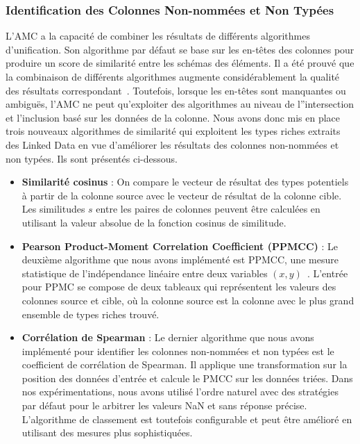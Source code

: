 \subsubsection{Identification des Colonnes Non-nomm\'{e}es et Non Typ\'{e}es}
L'AMC a la capacit\'{e} de combiner les r\'{e}sultats de diff\'{e}rents algorithmes d'unification. Son algorithme par d\'{e}faut se base sur les en-t\^{e}tes des colonnes pour produire un score de similarit\'{e} entre les sch\'{e}mas des \'{e}l\'{e}ments. Il a \'{e}t\'{e} prouv\'{e} que la combinaison de diff\'{e}rents algorithmes augmente consid\'{e}rablement la qualit\'{e} des r\'{e}sultats correspondant~\cite{Peukert:ICDE:12}\cite{conf/wise/StracciaT05}. Toutefois, lorsque les en-t\^{e}tes sont manquantes ou ambigu\"{e}s, l'AMC ne peut qu'exploiter des algorithmes au niveau de l''intersection et l'inclusion bas\'{e} sur les donn\'{e}es de la colonne. Nous avons donc mis en place trois nouveaux algorithmes de similarit\'{e} qui exploitent les types riches extraits des Linked Data en vue d'am\'{e}liorer les r\'{e}sultats des colonnes non-nomm\'{e}es et non typ\'{e}es. Ils sont pr\'{e}sent\'{e}s ci-dessous.

\begin{itemize}
	\item \textbf{Similarit\'{e} cosinus} : On compare le vecteur de r\'{e}sultat des types potentiels \`{a} partir de la colonne source avec le vecteur de r\'{e}sultat de la colonne cible. Les similitudes $s$ entre les paires de colonnes peuvent \^{e}tre calcul\'{e}es en utilisant la valeur absolue de la fonction cosinus de similitude.
	\item \textbf{Pearson Product-Moment Correlation Coefficient (PPMCC)} : Le deuxi\`{e}me algorithme que nous avons impl\'{e}ment\'{e} est PPMCC, une mesure statistique de l'ind\'{e}pendance lin\'{e}aire entre deux variables $\left(x,y\right)$~\cite{Kowalski:RoyalStat:72}. L'entr\'{e}e pour PPMC se compose de deux tableaux qui repr\'{e}sentent les valeurs des colonnes source et cible, o\`{u} la colonne source est la colonne avec le plus grand ensemble de types riches trouv\'{e}.
	\item \textbf{Corr\'{e}lation de Spearman} : Le dernier algorithme que nous avons impl\'{e}ment\'{e} pour identifier les colonnes non-nomm\'{e}es et non typ\'{e}es est le coefficient de corr\'{e}lation de Spearman. Il applique une transformation sur la position des donn\'{e}es d'entr\'{e}e et calcule le PMCC sur les donn\'{e}es tri\'{e}es. Dans nos exp\'{e}rimentations, nous avons utilis\'{e} l'ordre naturel avec des strat\'{e}gies par d\'{e}faut pour le arbitrer les valeurs NaN et sans r\'{e}ponse pr\'{e}cise. L'algorithme de classement est toutefois configurable et peut \^{e}tre am\'{e}lior\'{e} en utilisant des mesures plus sophistiqu\'{e}es.
\end{itemize}


